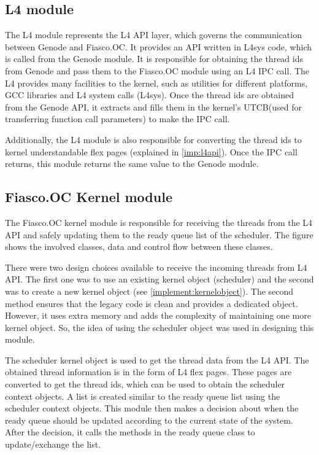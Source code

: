 \subsection{L4 module}

The L4 module represents the L4 API layer, which governs the communication between Genode and Fiasco.OC. It provides an API written in L4sys code, which is called from the Genode module. It is responsible for obtaining the thread ids from Genode and pass them to the Fiasco.OC module using an L4 IPC call. The L4 provides many facilities to the kernel, such as utilities for different platforms, GCC libraries and L4 system calls (L4sys). Once the thread ids are obtained from the Genode API, it extracts and fills them in the kernel's UTCB(used for transferring function call parameters) to make the IPC call.

Additionally, the L4 module is also responsible for converting the thread ids to kernel understandable flex pages (explained in \ref{imp:l4api}). Once the IPC call returns, this module returns the same value to the Genode module. 

\subsection{Fiasco.OC Kernel module}

The Fiasco.OC kernel module is responsible for receiving the threads from the L4 API and safely updating them to the ready queue list of the scheduler. The figure %
shows the involved classes, data and control flow between these classes.

There were two design choices available to receive the incoming threads from L4 API. The first one was to use an existing kernel object (scheduler) and the second was to create a new kernel object (see \ref{implement:kernelobject}). The second method ensures that the legacy code is clean and provides a dedicated object. However, it uses extra memory and adds the complexity of maintaining one more kernel object. So, the idea of using the scheduler object was used in designing this module. 

The scheduler kernel object is used to get the thread data from the L4 API. The obtained thread information is in the form of L4 flex pages. These pages are converted to get the thread ids, which can be used to obtain the scheduler context objects. A list is created similar to the ready queue list using the scheduler context objects. This module then makes a decision about when the ready queue should be updated according to the current state of the system. After the decision, it calls the methods in the ready queue class to update/exchange the list.

